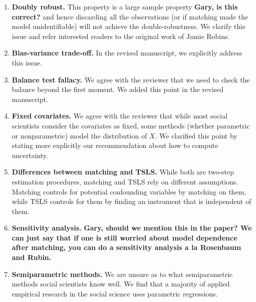 \documentclass[11pt]{article}
\begin{document}
\begin{enumerate}
\item {\bf Doubly robust.} This property is a large sample property
  {\bf Gary, is this correct?} and hence discarding all the
  observations (or if matching made the model unidentifiable) will not
  achieve the double-robustness. We clarify this issue and refer
  interested readers to the original work of Jamie Robins.
 
\item {\bf Bias-variance trade-off.} In the revised manuscript, we
  explicitly address this issue.

\item {\bf Balance test fallacy.} We agree with the reviewer that we
  need to check the balance beyond the first moment. We added this
  point in the revised manuscript. 

\item {\bf Fixed covariates.} We agree with the reviewer that while
  most social scientists consider the covariates as fixed, some
  methods (whether parametric or nonparametric) model the distribution
  of $X$. We clarified this point by stating more explicitly our
  recommendation about how to compute uncertainty.

\item {\bf Differences between matching and TSLS.} While both are
  two-step estimation procedures, matching and TSLS rely on different
  assumptions. Matching controls for potential confounding variables
  by matching on them, while TSLS controls for them by finding an
  instrument that is independent of them.

\item {\bf Sensitivity analysis.} {\bf Gary, should we mention this in
    the paper? We can just say that if one is still worried about
    model dependence after matching, you can do a sensitivity analysis
    a la Rosenbaum and Rubin. }

\item {\bf Semiparametric methods.} We are unsure as to what
  semiparametric methods social scientists know well. We find that a
  majority of applied empirical research in the social science uses
  parametric regressions. 

\end{enumerate}
\end{document}
